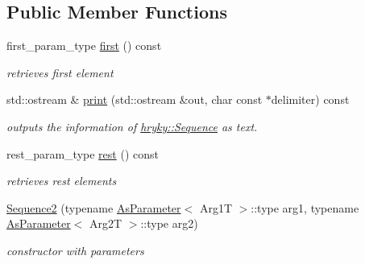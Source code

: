 \subsection*{Public Member Functions}
\begin{DoxyCompactItemize}
\item 
\hypertarget{classhryky_1_1_sequence_a881ed830dc76f92d29fe8feea122339b}{first\-\_\-param\-\_\-type \hyperlink{classhryky_1_1_sequence_a881ed830dc76f92d29fe8feea122339b}{first} () const}\label{classhryky_1_1_sequence_a881ed830dc76f92d29fe8feea122339b}

\begin{DoxyCompactList}\small\item\em retrieves first element \end{DoxyCompactList}\item 
\hypertarget{classhryky_1_1_sequence_a8443de2eb918764c345a86b40dd888db}{std\-::ostream \& \hyperlink{classhryky_1_1_sequence_a8443de2eb918764c345a86b40dd888db}{print} (std\-::ostream \&out, char const $\ast$delimiter) const}\label{classhryky_1_1_sequence_a8443de2eb918764c345a86b40dd888db}

\begin{DoxyCompactList}\small\item\em outputs the information of \hyperlink{classhryky_1_1_sequence}{hryky\-::\-Sequence} as text. \end{DoxyCompactList}\item 
\hypertarget{classhryky_1_1_sequence_a11e616cd4cfe41751bbaa350fca3dcb1}{rest\-\_\-param\-\_\-type \hyperlink{classhryky_1_1_sequence_a11e616cd4cfe41751bbaa350fca3dcb1}{rest} () const}\label{classhryky_1_1_sequence_a11e616cd4cfe41751bbaa350fca3dcb1}

\begin{DoxyCompactList}\small\item\em retrieves rest elements \end{DoxyCompactList}\item 
\hypertarget{classhryky_1_1_sequence2_a01295f421c467db5698331fb474b3650}{\hyperlink{classhryky_1_1_sequence2_a01295f421c467db5698331fb474b3650}{Sequence2} (typename \hyperlink{classhryky_1_1_as_parameter}{As\-Parameter}$<$ Arg1\-T $>$\-::type arg1, typename \hyperlink{classhryky_1_1_as_parameter}{As\-Parameter}$<$ Arg2\-T $>$\-::type arg2)}\label{classhryky_1_1_sequence2_a01295f421c467db5698331fb474b3650}

\begin{DoxyCompactList}\small\item\em constructor with parameters \end{DoxyCompactList}\end{DoxyCompactItemize}


